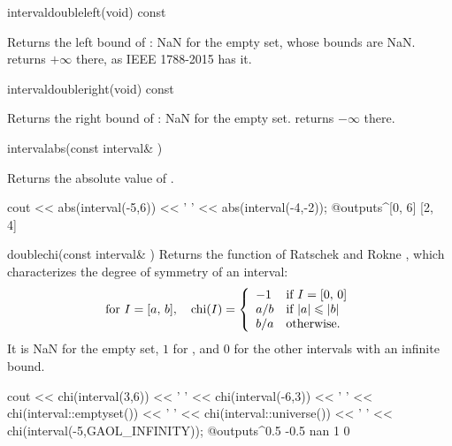 \begin{defmethod}{interval}{double}{left}{(void) const}
  \begin{operation}
  \end{operation}
  Returns the left bound of : NaN for the empty set, whose
  bounds are NaN.  returns $+\infty$ there, as
  IEEE 1788-2015 has it.
\end{defmethod}

\begin{defmethod}{interval}{double}{right}{(void) const}
  \begin{operation}
  \end{operation}
  Returns the right bound of : NaN for the empty set.
   returns $-\infty$ there.
\end{defmethod}

\begin{deffun}{interval}{abs}{(const interval\& )}
  \begin{operation}
  \end{operation}
  Returns the absolute value of .
  \begin{example}
cout << abs(interval(-5,6)) << ' '
     << abs(interval(-4,-2));
@outputs^[0, 6] [2, 4]~
  \end{example}
\end{deffun}

\begin{deffun}{double}{chi}{(const interval\& )}
  Returns the function  of Ratschek and Rokne
  \cite{Ratschek-Rokne:1995}, which characterizes the degree of symmetry
  of an interval:
\begin{equation*}
\text{for } I=[a,\,b],\quad\text{chi}(I)=\left\{\begin{array}{ll}
    -1  & \text{if } I = [0,\,0]\\
    a/b & \text{if } |a|\leqslant |b|\\
    b/a & \text{otherwise.}
  \end{array}\right.
\end{equation*}
  It is NaN for the empty set, $1$ for \itv{-\infty}{+\infty}, and $0$ for
  the other intervals with an infinite bound.
\begin{example}
cout << chi(interval(3,6)) << ' '
     << chi(interval(-6,3)) << ' '
     << chi(interval::emptyset()) << ' '
     << chi(interval::universe()) << ' '
     << chi(interval(-5,GAOL_INFINITY));
@outputs^0.5 -0.5 nan 1 0~
\end{example}
\end{deffun}

